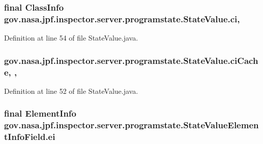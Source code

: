 \subsubsection[{\texorpdfstring{ci}{ci}}]{\setlength{\rightskip}{0pt plus 5cm}final Class\+Info gov.\+nasa.\+jpf.\+inspector.\+server.\+programstate.\+State\+Value.\+ci\hspace{0.3cm}{\ttfamily [protected]}, {\ttfamily [inherited]}}\hypertarget{classgov_1_1nasa_1_1jpf_1_1inspector_1_1server_1_1programstate_1_1_state_value_a0eb4aa1e630ed6372dcfb8c41ae7edc5}{}\label{classgov_1_1nasa_1_1jpf_1_1inspector_1_1server_1_1programstate_1_1_state_value_a0eb4aa1e630ed6372dcfb8c41ae7edc5}


Definition at line 54 of file State\+Value.\+java.

\subsubsection[{\texorpdfstring{ci\+Cache}{ciCache}}]{ gov.\+nasa.\+jpf.\+inspector.\+server.\+programstate.\+State\+Value.\+ci\+Cache\hspace{0.3cm}{\ttfamily [static]}, {\ttfamily [package]}, {\ttfamily [inherited]}}\hypertarget{classgov_1_1nasa_1_1jpf_1_1inspector_1_1server_1_1programstate_1_1_state_value_a38182b5018580765f3f2cdc9e96e1ca2}{}\label{classgov_1_1nasa_1_1jpf_1_1inspector_1_1server_1_1programstate_1_1_state_value_a38182b5018580765f3f2cdc9e96e1ca2}


Definition at line 52 of file State\+Value.\+java.

\subsubsection[{\texorpdfstring{ei}{ei}}]{\setlength{\rightskip}{0pt plus 5cm}final Element\+Info gov.\+nasa.\+jpf.\+inspector.\+server.\+programstate.\+State\+Value\+Element\+Info\+Field.\+ei\hspace{0.3cm}{\ttfamily [private]}}\hypertarget{classgov_1_1nasa_1_1jpf_1_1inspector_1_1server_1_1programstate_1_1_state_value_element_info_field_a5e6f3ff034c98330007fe320eb5ec253}{}\label{classgov_1_1nasa_1_1jpf_1_1inspector_1_1server_1_1programstate_1_1_state_value_element_info_field_a5e6f3ff034c98330007fe320eb5ec253}



